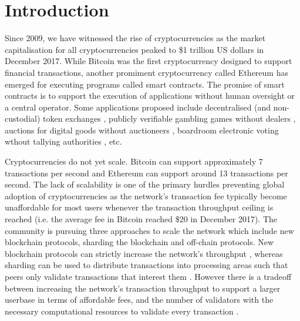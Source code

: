 \documentclass{llncs}
\begin{document}
	\section{Introduction}
	
	Since 2009, we have witnessed the rise of cryptocurrencies as the market capitalisation for all cryptocurrencies peaked to \$1 trillion US dollars in December 2017.
	While Bitcoin \cite{nakamoto2008bitcoin} was the first cryptocurrency designed to support financial transactions, another promiment cryptocurrency called Ethereum \cite{wood2014ethereum} has emerged for executing programs called smart contracts. 
	The promise of smart contracts is to support the execution of applications without human oversight or a central operator. 
	Some applications proposed include decentralised (and non-custodial) token exchanges \cite{luukybernetwork}, publicly verifiable gambling games without dealers \cite{funfair}, auctions for digital goods without auctioneers \cite{auctions}, boardroom electronic voting wthout tallying authorities \cite{mccorry2017smart}, etc. 
	
	Cryptocurrencies do not yet scale. 
	Bitcoin can support approximately 7 transactions per second and Ethereum can support around 13 transactions per second. 
	The lack of scalability is one of the primary hurdles preventing global adoption of cryptocurrencies as the network's transaction fee typically become unaffordable  for most users whenever the transaction throughput ceiling is reached (i.e. the average fee in Bitcoin reached \$20 in December 2017).
	The community is pursuing three approaches to scale the network which include new blockchain protocols, sharding the blockchain and off-chain protocols. 
	New blockchain protocols can strictly increase the network's throughput \cite{sompolinsky2016spectre,eyal2016bitcoin,sompolinsky2015secure}, whereas sharding can be used to distribute transactions into processing areas such that peers only validate transactions that interest them \cite{kokoris2018omniledger,al2017chainspace,luu2016secure}. 
	However there is a tradeoff between increasing the network's transaction throughput to support a larger userbase in terms of affordable fees, and the number of validators with the necessary computational resources to validate every transaction \cite{mccorry2017atomically,gervais2016security,croman2016scaling}.
	
\end{document}
